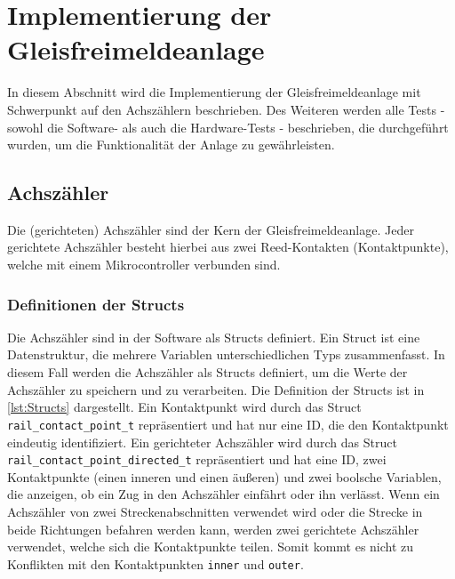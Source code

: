 \section{Implementierung der Gleisfreimeldeanlage}\label{text:Entwicklung-der-GFA:Implementierung-der-Gleisfreimeldeanlage}

In diesem Abschnitt wird die Implementierung der Gleisfreimeldeanlage mit Schwerpunkt auf den Achszählern beschrieben. Des Weiteren werden alle Tests - sowohl die Software- als auch die Hardware-Tests - beschrieben, die durchgeführt wurden, um die Funktionalität der Anlage zu gewährleisten.

\subsection{Achszähler}\label{text:Entwicklung-der-GFA:Implementierung-der-Gleisfreimeldeanlage:Achszähler}

Die (gerichteten) Achszähler sind der Kern der Gleisfreimeldeanlage. Jeder gerichtete Achszähler besteht hierbei aus zwei Reed-Kontakten (Kontaktpunkte), welche mit einem Mikrocontroller verbunden sind. 

\subsubsection{Definitionen der Structs}\label{text:Entwicklung-der-GFA:Implementierung-der-Gleisfreimeldeanlage:Achszähler:Definitionen-der-Structs}

Die Achszähler sind in der Software als Structs definiert. Ein Struct ist eine Datenstruktur, die mehrere Variablen unterschiedlichen Typs zusammenfasst. In diesem Fall werden die Achszähler als Structs definiert, um die Werte der Achszähler zu speichern und zu verarbeiten. Die Definition der Structs ist in \autoref{lst:Structs} dargestellt. Ein Kontaktpunkt wird durch das Struct \texttt{rail\_contact\_point\_t} repräsentiert und hat nur eine ID, die den Kontaktpunkt eindeutig identifiziert. Ein gerichteter Achszähler wird durch das Struct \texttt{rail\_contact\_point\_directed\_t} repräsentiert und hat eine ID, zwei Kontaktpunkte (einen inneren und einen äußeren) und zwei boolsche Variablen, die anzeigen, ob ein Zug in den Achszähler einfährt oder ihn verlässt. 
\newline
Wenn ein Achszähler von zwei Streckenabschnitten verwendet wird oder die Strecke in beide Richtungen befahren werden kann, werden zwei gerichtete Achszähler verwendet, welche sich die Kontaktpunkte teilen. Somit kommt es nicht zu Konflikten mit den Kontaktpunkten \texttt{inner} und \texttt{outer}.

